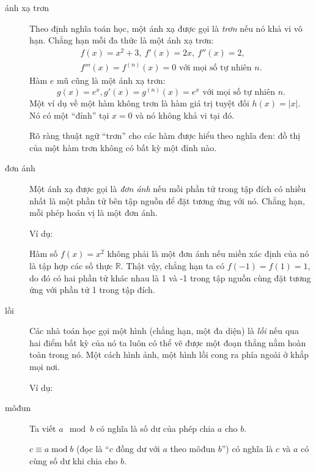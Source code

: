 \begin{description}
	\item[ánh xạ trơn] Theo định nghĩa toán học, một ánh xạ được gọi là \emph{trơn} nếu nó khả vi vô hạn.  Chẳng hạn mỗi đa thức là một ánh xạ trơn:
		\begin{gather*}
		f(x) = x^2 + 3,\ f'(x) = 2x,\ f''(x) = 2,\\
		f'''(x) = f^{(n)}(x) = 0 \text{ với mọi số tự nhiên  } n.
		\end{gather*}
		Hàm $e$ mũ cũng là một ánh xạ trơn:  
		\begin{equation*}
		g(x) = e^x, g'(x) = g^{(n)}(x) = e^x \text{ với mọi số tự nhiên } n.
		\end{equation*}
		Một ví dụ về một hàm không trơn là hàm giá trị tuyệt đối  $h(x) = |x|.$ Nó có một \enquote{đỉnh} tại $x=0$ và nó không khả vi tại đó.

		Rõ ràng thuật ngữ \enquote{trơn} cho các hàm được hiểu theo nghĩa đen: đồ thị của một hàm trơn không có bất kỳ một đỉnh nào.

	\item[đơn ánh]  Một ánh xạ được gọi là \emph{đơn ánh} nếu mỗi phần tử trong tập đích có nhiều nhất là một phần tử bên tập nguồn để đặt tương ứng với nó. Chẳng hạn, mỗi phép hoán vị  là một đơn ánh. 

		Ví dụ:
		\begin{figure}[H] 
			\centering 
			\def\svgwidth{200pt} 
			 
		\end{figure}
		Hàm số  $f(x) = x^2$ không phải là một đơn ánh  nếu miền xác định  của nó là tập hợp các số thực $\mathbb R$. Thật vậy, chẳng hạn ta có $f(-1) = f(1) = 1$, do đó có hai phần tử  khác nhau là 1 và -1  trong tập nguồn cùng đặt tương ứng với phần tử 1 trong tập đích.

	\item[lồi] Các nhà toán học gọi một hình (chẳng hạn, một đa diện) là \emph{lồi} nếu qua hai  điểm bất kỳ của nó ta luôn có thể vẽ được một đoạn thẳng nằm hoàn toàn trong nó. Một cách hình ảnh, một hình lồi cong  ra phía ngoài ở khắp mọi nơi.

		Ví dụ: 
		\begin{figure} 
			\def\svgwidth{270pt} 
			 
		\end{figure}

	\item[môđun] Ta viết $a \mod b$  có nghĩa là  số  dư của phép chia $a$ cho $b$.  

		$c\equiv a \operatorname{mod} b$ (đọc là \enquote{$c$ đồng dư với $a$ theo môđun $b$}) có nghĩa là  $c$ và $a$ có cùng số dư khi chia cho $b$. 


\end{description}
